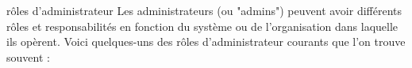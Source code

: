 \begin{frame}{rôles d'administrateur }
Les administrateurs (ou "admins") peuvent avoir différents rôles et responsabilités en fonction du système ou de l'organisation dans laquelle ils opèrent. Voici quelques-uns des rôles d'administrateur courants que l'on trouve souvent :
    
\end{frame}